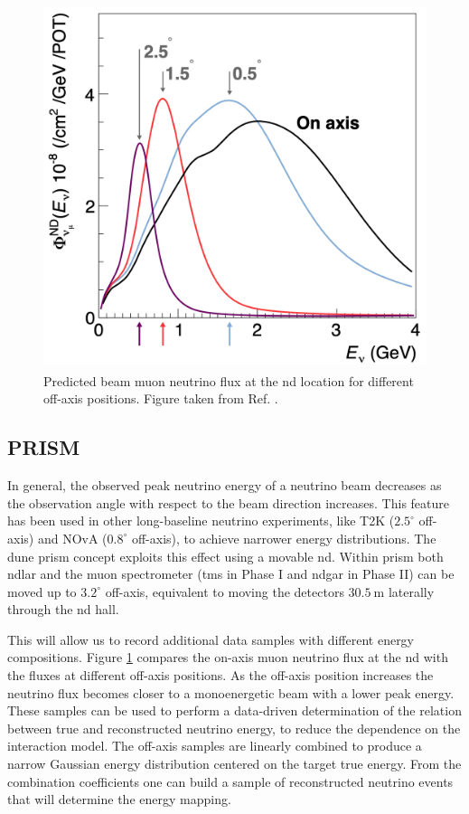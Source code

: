 \begin{figure}[t]
	\centering
	\includegraphics[width=0.55\linewidth]{Images/DUNE/ND/prism_spectra}
	\caption[Predicted beam muon neutrino flux at the \gls{nd} location for different off-axis positions.]{Predicted beam muon neutrino flux at the \gls{nd} location for different off-axis positions. Figure taken from Ref. \cite{DUNE2021NDCDR}.}
	\label{fig:dune_prism}
\end{figure}

\subsection{PRISM}

In general, the observed peak neutrino energy of a neutrino beam decreases as the observation angle with respect to the beam direction increases. This feature has been used in other long-baseline neutrino experiments, like T2K ($2.5^{\circ}$ off-axis) and NOvA ($0.8^{\circ}$ off-axis), to achieve narrower energy distributions. The \gls{dune} \gls{prism} concept exploits this effect using a movable \gls{nd}. Within \gls{prism} both \gls{ndlar} and the muon spectrometer (\gls{tms} in Phase I and \gls{ndgar} in Phase II) can be moved up to $3.2^{\circ}$ off-axis, equivalent to moving the detectors $30.5~\mathrm{m}$ laterally through the \gls{nd} hall.

This will allow us to record additional data samples with different energy compositions. Figure \ref{fig:dune_prism} compares the on-axis muon neutrino flux at the \gls{nd} with the fluxes at different off-axis positions. As the off-axis position increases the neutrino flux becomes closer to a monoenergetic beam with a lower peak energy. These samples can be used to perform a data-driven determination of the relation between true and reconstructed neutrino energy, to reduce the dependence on the interaction model. The off-axis samples are linearly combined to produce a narrow Gaussian energy distribution centered on the target true energy. From the combination coefficients one can build a sample of reconstructed neutrino events that will determine the energy mapping.

